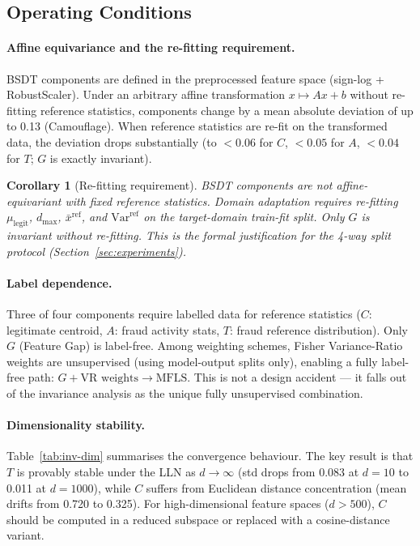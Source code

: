 \documentclass[journal]{IEEEtran}
\newtheorem{corollary}{Corollary}
\begin{document}
\subsection{Operating Conditions}

\paragraph{Affine equivariance and the re-fitting requirement.}
BSDT components are defined in the preprocessed feature space (sign-log + RobustScaler).  Under an arbitrary affine transformation $x \mapsto Ax + b$ without re-fitting reference statistics, components change by a mean absolute deviation of up to 0.13 (Camouflage).  When reference statistics are re-fit on the transformed data, the deviation drops substantially (to $<0.06$ for $C$, $<0.05$ for $A$, $<0.04$ for $T$; $G$ is exactly invariant).

\begin{corollary}[Re-fitting requirement]
\label{cor:refit}
BSDT components are not affine-equivariant with fixed reference statistics.  Domain adaptation requires re-fitting $\mu_\text{legit}$, $d_{\max}$, $\bar{x}^{\text{ref}}$, and $\text{Var}^{\text{ref}}$ on the target-domain train-fit split.  Only $G$ is invariant without re-fitting.  This is the formal justification for the 4-way split protocol (Section~\ref{sec:experiments}).
\end{corollary}

\paragraph{Label dependence.}
Three of four components require labelled data for reference statistics ($C$: legitimate centroid, $A$: fraud activity stats, $T$: fraud reference distribution).  Only $G$ (Feature Gap) is label-free.  Among weighting schemes, Fisher Variance-Ratio weights are unsupervised (using model-output splits only), enabling a fully label-free path: $G + \text{VR weights} \to \text{MFLS}$.  This is not a design accident --- it falls out of the invariance analysis as the unique fully unsupervised combination.

\paragraph{Dimensionality stability.}
Table~\ref{tab:inv-dim} summarises the convergence behaviour.  The key result is that $T$ is provably stable under the LLN as $d \to \infty$ (std drops from 0.083 at $d=10$ to 0.011 at $d=1000$), while $C$ suffers from Euclidean distance concentration (mean drifts from 0.720 to 0.325).  For high-dimensional feature spaces ($d > 500$), $C$ should be computed in a reduced subspace or replaced with a cosine-distance variant.
\end{document}
